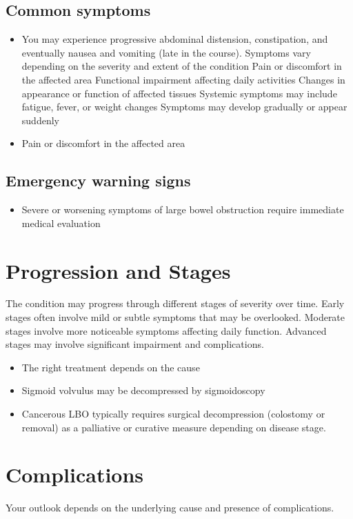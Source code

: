\subsection{Common symptoms}
\begin{itemize}[noitemsep]
  \item You may experience progressive abdominal distension, constipation, and eventually nausea and vomiting (late in the course). Symptoms vary depending on the severity and extent of the condition Pain or discomfort in the affected area Functional impairment affecting daily activities Changes in appearance or function of affected tissues Systemic symptoms may include fatigue, fever, or weight changes Symptoms may develop gradually or appear suddenly
  \item Pain or discomfort in the affected area
  \end{itemize}

\subsection{Emergency warning signs}
\begin{itemize}[noitemsep]
  \item Severe or worsening symptoms of large bowel obstruction require immediate medical evaluation
\end{itemize}
\section{Progression and Stages}
The condition may progress through different stages of severity over time. Early stages often involve mild or subtle symptoms that may be overlooked. Moderate stages involve more noticeable symptoms affecting daily function. Advanced stages may involve significant impairment and complications.

\begin{itemize}[noitemsep]
  \item The right treatment depends on the cause
  \item Sigmoid volvulus may be decompressed by sigmoidoscopy
  \item Cancerous LBO typically requires surgical decompression (colostomy or removal) as a palliative or curative measure depending on disease stage.
\end{itemize}
\section{Complications}
Your outlook depends on the underlying cause and presence of complications.

